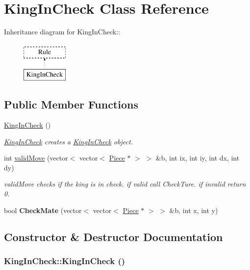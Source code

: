 \hypertarget{classKingInCheck}{
\section{KingInCheck Class Reference}
\label{classKingInCheck}
}
Inheritance diagram for KingInCheck::\begin{figure}[H]
\begin{center}
\leavevmode
\includegraphics[height=2cm]{classKingInCheck}
\end{center}
\end{figure}
\subsection*{Public Member Functions}
\begin{DoxyCompactItemize}
\item 
\hyperlink{classKingInCheck_ac3c04d5e0646f84c185e61ef739262ee}{KingInCheck} ()
\begin{DoxyCompactList}\small\item\em \hyperlink{classKingInCheck}{KingInCheck} creates a \hyperlink{classKingInCheck}{KingInCheck} object. \item\end{DoxyCompactList}\item 
int \hyperlink{classKingInCheck_a5c9860dc659beddf2c8e7e471778c60c}{validMove} (vector$<$ vector$<$ \hyperlink{classPiece}{Piece} $\ast$ $>$ $>$ \&b, int ix, int iy, int dx, int dy)
\begin{DoxyCompactList}\small\item\em validMove checks if the king is in check. if valid call CheckTure. if invalid return 0. \item\end{DoxyCompactList}\item 
\hypertarget{classKingInCheck_a487117dfeb79f8d4f9c62ce02f9251ce}{
bool {\bfseries CheckMate} (vector$<$ vector$<$ \hyperlink{classPiece}{Piece} $\ast$ $>$ $>$ \&b, int x, int y)}
\label{classKingInCheck_a487117dfeb79f8d4f9c62ce02f9251ce}

\end{DoxyCompactItemize}


\subsection{Constructor \& Destructor Documentation}
\hypertarget{classKingInCheck_ac3c04d5e0646f84c185e61ef739262ee}{
\subsubsection[{KingInCheck}]{\setlength{\rightskip}{0pt plus 5cm}KingInCheck::KingInCheck ()}}
\label{classKingInCheck_ac3c04d5e0646f84c185e61ef739262ee}


